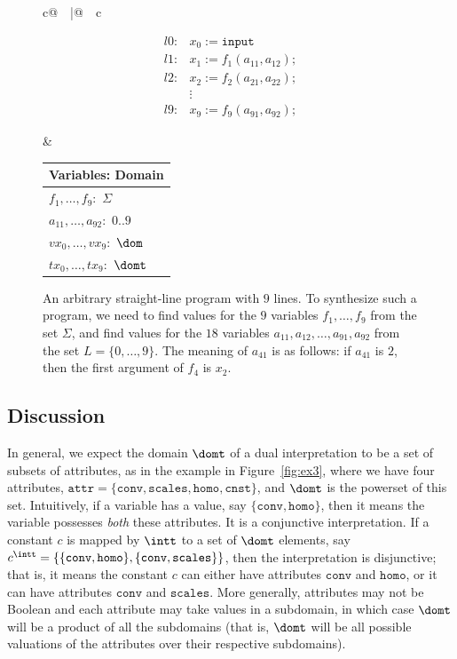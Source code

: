 \documentclass[preprint]{sig-alternate-05-2015}
\def\Sig{{\Sigma}}
\def\conv{{\mathtt{conv}}}
\def\scales{{\mathtt{scales}}}
\def\homo{{\mathtt{homo}}}
\def\cnst{{\mathtt{cnst}}}
\def\attr{{\mathtt{attr}}}
\begin{document}
{\begin{figure}[t]
  \begin{tabular}{c@{$\quad$}|@{$\quad$}c}
    \begin{minipage}{40mm}
\begin{center}
\[
  \begin{array}{ll}
    l0: & x_0 := \mathtt{input}
    \\
    l1: & x_1 := f_1(a_{11}, a_{12});
    \\
    l2: & x_2 := f_2(a_{21}, a_{22});
    \\
    & \vdots
    \\
    l9: & x_9 := f_9(a_{91}, a_{92});
  \end{array}
\]
\end{center}
    \end{minipage}
    &
    \begin{minipage}{20mm}
      \begin{tabular}{l}
        Variables: Domain
        \\ \hline
        $f_1,\ldots,f_9:$   $\Sig$
        \\
        $a_{11},\ldots,a_{92}:$   $0..9$
        \\
        $vx_0,\ldots,vx_9:$ $\dom$
        \\
        $tx_0,\ldots,tx_9:$ $\domt$
      \end{tabular}
    \end{minipage}
  \end{tabular}
\caption{An arbitrary straight-line program with $9$ lines. To synthesize such a program, we need to find values for the $9$ variables $f_1,\ldots,f_9$ from the set $\Sig$, and find values for the $18$ variables $a_{11},a_{12}, \ldots,a_{91},a_{92}$ from the set $L = \{0,\ldots,9\}$. The meaning of $a_{41}$ is as follows: if $a_{41}$ is $2$, then the first argument of $f_4$ is $x_2$.}\label{fig:sketch}
\end{figure}

\subsection{Discussion}

In general, we expect the domain $\domt$ of a dual interpretation to be a set
of subsets of attributes, as in the example in Figure~\ref{fig:ex3}, where
we have
four attributes, $\attr = \{\conv,\scales,\homo,\cnst\}$, and
$\domt$ is the powerset of this set.
Intuitively, if a variable has a value, say $\{\conv,\homo\}$, then
it means the variable possesses {\em{both}} these attributes.
It is a conjunctive interpretation.
If a constant $c$ is mapped by $\intt$ to a set of $\domt$ elements,
say $c^\intt = \{ \{\conv,\homo\}, \-\{\conv,\scales\}\}$, then
the interpretation is disjunctive; that is, it means the
constant $c$
can either have attributes
$\conv$ and $\homo$,
or %
it can have attributes
$\conv$ and $\scales$.
More generally, attributes may not be Boolean and each
attribute may take values in a subdomain, in which case
$\domt$ will be a product of all the subdomains
(that is, $\domt$ will be all possible valuations of the attributes
over their respective subdomains).

}
\end{document}
